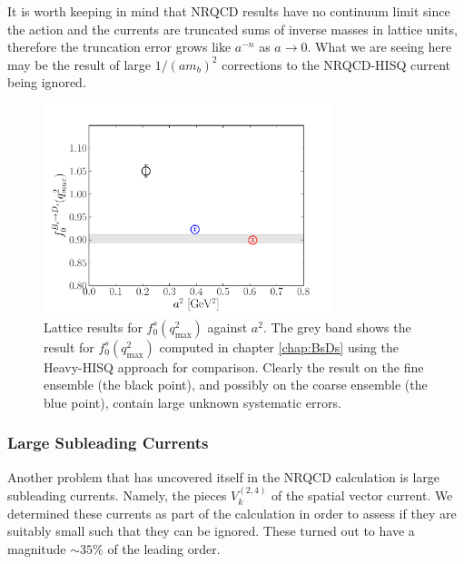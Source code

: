 It is worth keeping in mind that NRQCD results have no continuum limit since the action and the currents are truncated sums of inverse masses in lattice units, therefore the truncation error grows like $a^{-n}$ as $a\to 0$. What we are seeing here may be the result of large $1/(am_b)^2$ corrections to the NRQCD-HISQ current being ignored.

\begin{figure}[htb!]
  \vspace{-20pt}
  \begin{center}
    \includegraphics[width=0.75\textwidth]{images/nrqcd/BsDs_f0q2max.pdf}
  \end{center}
  \caption{Lattice results for $f_0^s(q^2_{\text{max}})$ against $a^2$. The grey band shows the result for $f_0^s(q^2_{\text{max}})$ computed in chapter \ref{chap:BsDs} using the Heavy-HISQ approach for comparison. Clearly the result on the fine ensemble (the black point), and possibly on the coarse ensemble (the blue point), contain large unknown systematic errors. \label{fig:BsDs_f0q2max}}

\end{figure}

\subsubsection{Large Subleading Currents}
\label{sec:largesubleadingcurrents}

Another problem that has uncovered itself in the NRQCD calculation is large subleading currents. Namely, the pieces $V^{(2,4)}_k$ of the spatial vector current. We determined these currents as part of the calculation in order to assess if they are suitably small such that they can be ignored. These turned out to have a magnitude $\sim 35\%$ of the leading order.

